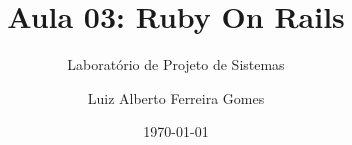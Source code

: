 \author{Luiz Alberto Ferreira Gomes}
\title{Aula 03: Ruby On Rails}
\subtitle{Laboratório de Projeto de Sistemas}
\date{\today}

